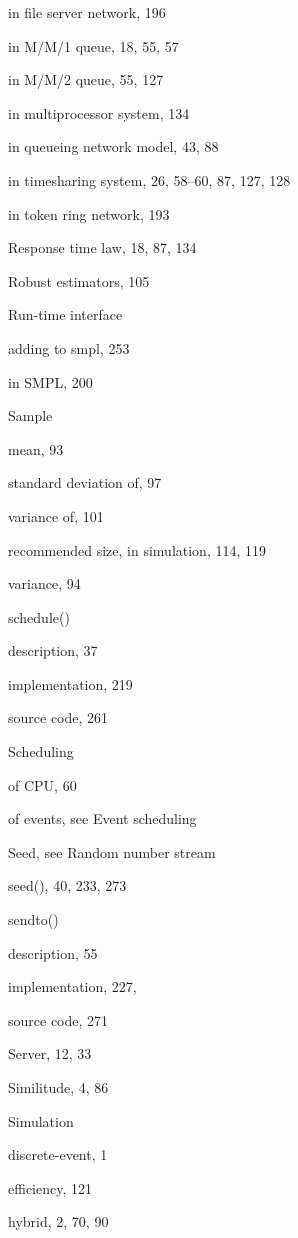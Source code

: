 \quad in file server network, 196\par
\quad in M/M/1 queue, 18, 55, 57\par
\quad in M/M/2 queue, 55, 127\par
\quad in multiprocessor system, 134\par
\quad in queueing network model, 43, 88\par
\quad in timesharing system, 26, 58--60, 87, 127, 128\par
\quad in token ring network, 193\par
\noindent Response time law, 18, 87, 134\par
\noindent Robust estimators, 105\par
\noindent Run-time interface\par
\quad adding to smpl, 253\par
\quad in SMPL, 200\par
\noindent Sample\par
\quad mean, 93\par
\qquad standard deviation of, 97\par
\qquad variance of, 101\par
\quad recommended size, in simulation, 114, 119\par
\quad variance, 94\par
\noindent schedule()\par
\quad description, 37\par
\quad implementation, 219\par
\quad source code, 261\par
\noindent Scheduling\par
\quad of CPU, 60\par
\quad of events, see Event scheduling\par
\noindent Seed, see Random number stream\par
\noindent seed(), 40, 233, 273\par
\noindent sendto()\par
\quad description, 55\par
\quad implementation, 227,\par
\quad source code, 271\par
\noindent Server, 12, 33\par
\noindent Similitude, 4, 86\par
\noindent Simulation\par
\quad discrete-event, 1\par
\quad efficiency, 121\par
\quad hybrid, 2, 70, 90\par
